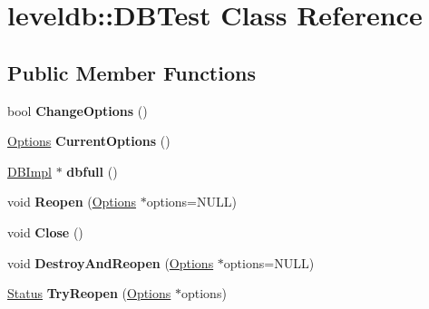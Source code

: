 \hypertarget{classleveldb_1_1_d_b_test}{}\section{leveldb\+:\+:D\+B\+Test Class Reference}
\label{classleveldb_1_1_d_b_test}
\subsection*{Public Member Functions}
\begin{DoxyCompactItemize}
\item 
\mbox{\label{classleveldb_1_1_d_b_test_a587534fe403016f15cf1997ef7a40836}} 
bool {\bfseries Change\+Options} ()
\item 
\mbox{\label{classleveldb_1_1_d_b_test_a68db410e16195a3b67822bec05c06547}} 
\mbox{\hyperlink{structleveldb_1_1_options}{Options}} {\bfseries Current\+Options} ()
\item 
\mbox{\label{classleveldb_1_1_d_b_test_a67de35d247ea077c1e4fdf2a7a0f0514}} 
\mbox{\hyperlink{classleveldb_1_1_d_b_impl}{D\+B\+Impl}} $\ast$ {\bfseries dbfull} ()
\item 
\mbox{\label{classleveldb_1_1_d_b_test_a38170a082cbc71fb446408ff5634c797}} 
void {\bfseries Reopen} (\mbox{\hyperlink{structleveldb_1_1_options}{Options}} $\ast$options=N\+U\+LL)
\item 
\mbox{\label{classleveldb_1_1_d_b_test_aee76446bbb9c34cdb1ae00318689aead}} 
void {\bfseries Close} ()
\item 
\mbox{\label{classleveldb_1_1_d_b_test_ab798a43e7feab6dddc8fa1eb7a5f61f6}} 
void {\bfseries Destroy\+And\+Reopen} (\mbox{\hyperlink{structleveldb_1_1_options}{Options}} $\ast$options=N\+U\+LL)
\item 
\mbox{\label{classleveldb_1_1_d_b_test_aee588b2d13db6be2a651a8fabeac5c79}} 
\mbox{\hyperlink{classleveldb_1_1_status}{Status}} {\bfseries Try\+Reopen} (\mbox{\hyperlink{structleveldb_1_1_options}{Options}} $\ast$options)
\item 

\end{DoxyCompactItemize}
